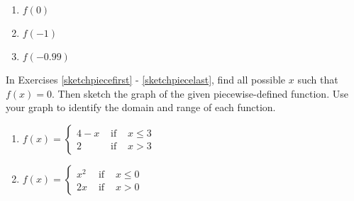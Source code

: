 \begin{enumerate}
\begin{multicols}{3}
\begin{enumerate}
\setcounter{HWindent}{\value{enumii}}
\end{enumerate}
\end{multicols}

\begin{multicols}{3}
\begin{enumerate}
\setcounter{enumii}{\value{HWindent}}

\item $f(0)$
\item $f(-1)$
\item $f(-0.99)$

\setcounter{HWindent}{\value{enumii}}
\end{enumerate}
\end{multicols}

\setcounter{HW}{\value{enumi}}
\end{enumerate}

In Exercises \ref{sketchpiecefirst} - \ref{sketchpiecelast}, find all possible $x$ such that $f(x)=0$.  Then sketch the graph of the given piecewise-defined function.  Use your graph to identify the domain and range of each function.

\begin{multicols}{2}
\begin{enumerate}
\setcounter{enumi}{\value{HW}}

\item ${\displaystyle f(x) = \left\{ \begin{array}{rcl} 4-x & \mbox{ if } &  x \leq 3 \\
                                                            2 & \mbox{ if } & x > 3 
                                     \end{array} \right. }$ \label{sketchpiecefirst}

\item ${\displaystyle f(x) = \left\{ \begin{array}{rcl} x^2 & \mbox{ if } & x \leq 0 \\
                                                     2x & \mbox{ if } & x > 0
                                  \end{array} \right. }$

\setcounter{HW}{\value{enumi}}
\end{enumerate}
\end{multicols}


